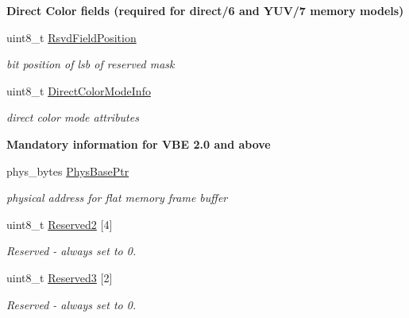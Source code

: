\begin{Indent}{\bf Direct Color fields (required for direct/6 and Y\+U\+V/7 memory models)}
\begin{DoxyCompactItemize}
uint8\+\_\+t \hyperlink{structvbe__mode__info__t_aa357b085181776f2918a6df25c88846b}{Rsvd\+Field\+Position}
\begin{DoxyCompactList}\small\item\em bit position of lsb of reserved mask \end{DoxyCompactList}\item 
uint8\+\_\+t \hyperlink{structvbe__mode__info__t_a3bf2fd2394ec8649ec3d26104be35dd7}{Direct\+Color\+Mode\+Info}
\begin{DoxyCompactList}\small\item\em direct color mode attributes \end{DoxyCompactList}\end{DoxyCompactItemize}
\end{Indent}
\begin{Indent}{\bf Mandatory information for V\+BE 2.0 and above}\par
\begin{DoxyCompactItemize}
\item 
phys\+\_\+bytes \hyperlink{structvbe__mode__info__t_a1d11f4921094db253fc2c2ee6fbb2afb}{Phys\+Base\+Ptr}
\begin{DoxyCompactList}\small\item\em physical address for flat memory frame buffer \end{DoxyCompactList}\item 
uint8\+\_\+t \hyperlink{structvbe__mode__info__t_a09b5824ec5c67bee2a4b36c0ab5181bc}{Reserved2} \mbox{[}4\mbox{]}
\begin{DoxyCompactList}\small\item\em Reserved -\/ always set to 0. \end{DoxyCompactList}\item 
uint8\+\_\+t \hyperlink{structvbe__mode__info__t_a2455a82e0d8cc0e8d76e8cf77a68bd39}{Reserved3} \mbox{[}2\mbox{]}
\begin{DoxyCompactList}\small\item\em Reserved -\/ always set to 0. \end{DoxyCompactList}\end{DoxyCompactItemize}
\end{Indent}

